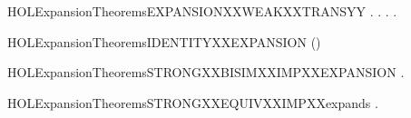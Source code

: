 \newcommand{\HOLExpansionTheoremsEXPANSIONXXSUBSETXXexpands}{\UseVerbatim{HOLExpansionTheoremsEXPANSIONXXSUBSETXXexpands}}
\begin{SaveVerbatim}{HOLExpansionTheoremsEXPANSIONXXWEAKXXTRANSYY}
\HOLTokenTurnstile{} \HOLSymConst{\HOLTokenForall{}}.
         \HOLSymConst{\HOLTokenImp{}}
       \HOLSymConst{\HOLTokenForall{}} .
              \HOLSymConst{\HOLTokenImp{}}
           \HOLSymConst{\HOLTokenForall{}} .  \HOLTokenWeakTransBegin{}\HOLTokenWeakTransEnd {} \HOLSymConst{\HOLTokenImp{}} \HOLSymConst{\HOLTokenExists{}}.  \HOLTokenWeakTransBegin{}\HOLTokenWeakTransEnd {} \HOLSymConst{\HOLTokenConj{}}   
\end{SaveVerbatim}
\newcommand{\HOLExpansionTheoremsEXPANSIONXXWEAKXXTRANSYY}{\UseVerbatim{HOLExpansionTheoremsEXPANSIONXXWEAKXXTRANSYY}}
\begin{SaveVerbatim}{HOLExpansionTheoremsIDENTITYXXEXPANSION}
\HOLTokenTurnstile{}  (\HOLSymConst{=})
\end{SaveVerbatim}
\newcommand{\HOLExpansionTheoremsIDENTITYXXEXPANSION}{\UseVerbatim{HOLExpansionTheoremsIDENTITYXXEXPANSION}}
\begin{SaveVerbatim}{HOLExpansionTheoremsSTRONGXXBISIMXXIMPXXEXPANSION}
\HOLTokenTurnstile{} \HOLSymConst{\HOLTokenForall{}}.   \HOLSymConst{\HOLTokenImp{}}  
\end{SaveVerbatim}
\newcommand{\HOLExpansionTheoremsSTRONGXXBISIMXXIMPXXEXPANSION}{\UseVerbatim{HOLExpansionTheoremsSTRONGXXBISIMXXIMPXXEXPANSION}}
\begin{SaveVerbatim}{HOLExpansionTheoremsSTRONGXXEQUIVXXIMPXXexpands}
\HOLTokenTurnstile{} \HOLSymConst{\HOLTokenForall{}} .    \HOLSymConst{\HOLTokenImp{}}   
\end{SaveVerbatim}
\newcommand{\HOLExpansionTheoremsSTRONGXXEQUIVXXIMPXXexpands}{\UseVerbatim{HOLExpansionTheoremsSTRONGXXEQUIVXXIMPXXexpands}}
